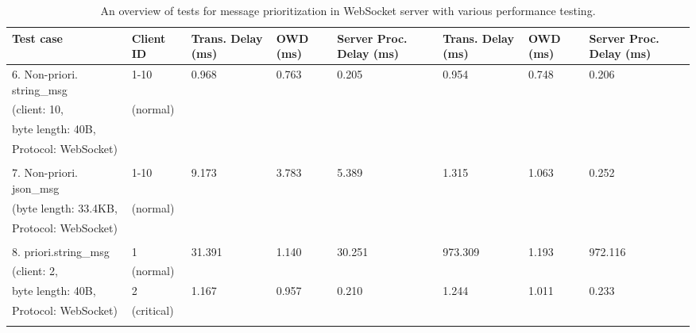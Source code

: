     \begin{table}[htbp]
        \footnotesize
    \centering
    \caption{An overview of tests for message prioritization in WebSocket server with various performance testing.}
    \label{tab: TestsPriority}

    \begin{tabular}{m{} m{} m{} m{} m{} m{} m{} m{}}
        \textbf{Test case}                     & \textbf{Client ID}  & \textbf{Trans. Delay (ms)} & \textbf{OWD (ms)}    & \textbf{Server Proc. Delay (ms)} & \textbf{Trans. Delay (ms)} & \textbf{OWD (ms)}    & \textbf{Server Proc. Delay (ms)} \\ \hline
        6. Non-priori. string\_msg    & 1-10       & 0.968   & 0.763  & 0.205   & 0.954   & 0.748  & 0.206   \\
        (client: 10,                  & (normal)   &         &        &         &         &        &         \\
        byte length: 40B,             &            &         &        &         &         &        &         \\
        Protocol: WebSocket)          &            &         &        &         &         &        &         \\
        & & & & & & &\\
        7. Non-priori. json\_msg      & 1-10       & 9.173   & 3.783  & 5.389   & 1.315   & 1.063  & 0.252   \\
        (byte length: 33.4KB,         & (normal)   &         &        &         &         &        &         \\
        Protocol: WebSocket)          &            &         &        &         &         &        &         \\
        & & & & & & &\\
        8. priori.string\_msg         & 1          & 31.391  & 1.140  & 30.251  & 973.309 & 1.193  & 972.116 \\
        (client: 2,                   & (normal)   &         &        &         &         &        &         \\
        byte length: 40B,             & 2          & 1.167   & 0.957  & 0.210   & 1.244   & 1.011  & 0.233   \\
        Protocol: WebSocket)          & (critical) &         &        &         &         &        &         \\
        & & & & & & &\\

\end{tabular}
\end{table}
